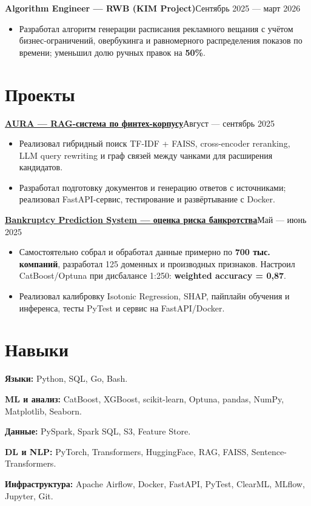 \documentclass[10pt,a4paper]{article}
\newcommand{\project}[3]{\textbf{\href{#2}{#1}}\hfill{\small #3}\par}
\begin{document}
\textbf{Algorithm Engineer — RWB (KIM Project)}\hfill Сентябрь 2025 — март 2026\par
\begin{itemize}
\item Разработал алгоритм генерации расписания рекламного вещания с учётом бизнес-ограничений, овербукинга и равномерного распределения показов по времени; уменьшил долю ручных правок на \textbf{50\%}.
\end{itemize}

\section{Проекты}
\project{AURA — RAG-система по финтех-корпусу}{https://github.com/V-L-A-P-P/AURA}{Август — сентябрь 2025}
\begin{itemize}
\item Реализовал гибридный поиск TF-IDF + FAISS, cross-encoder reranking, LLM query rewriting и граф связей между чанками для расширения кандидатов.
\item Разработал подготовку документов и генерацию ответов с источниками; реализовал FastAPI-сервис, тестирование и развёртывание с Docker.
\end{itemize}

\project{Bankruptcy Prediction System — оценка риска банкротства}{https://github.com/V-L-A-P-P/Bankruptcy_Prediction_System}{Май — июнь 2025}
\begin{itemize}
\item Самостоятельно собрал и обработал данные примерно по \textbf{700 тыс. компаний}, разработал 125 доменных и производных признаков. Настроил CatBoost/Optuna при дисбалансе 1:250: \textbf{weighted accuracy = 0,87}.
\item Реализовал калибровку Isotonic Regression, SHAP, пайплайн обучения и инференса, тесты PyTest и сервис на FastAPI/Docker.
\end{itemize}

\section{Навыки}
\textbf{Языки:} Python, SQL, Go, Bash.\par
\textbf{ML и анализ:} CatBoost, XGBoost, scikit-learn, Optuna, pandas, NumPy, Matplotlib, Seaborn.\par
\textbf{Данные:} PySpark, Spark SQL, S3, Feature Store.\par
\textbf{DL и NLP:} PyTorch, Transformers, HuggingFace, RAG, FAISS, Sentence-Transformers.\par
\textbf{Инфраструктура:} Apache Airflow, Docker, FastAPI, PyTest, ClearML, MLflow, Jupyter, Git.
\end{document}
